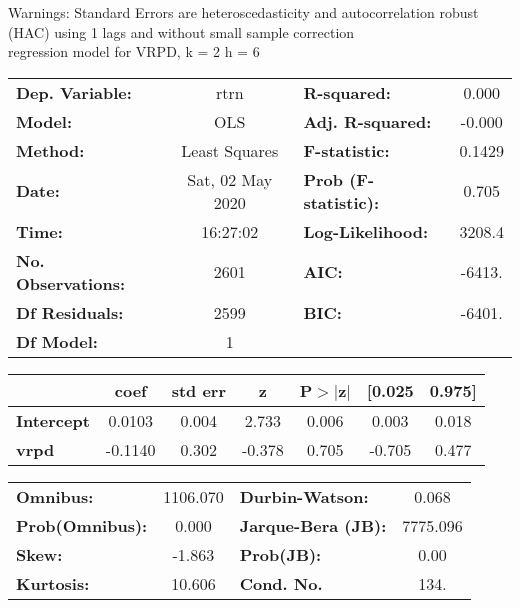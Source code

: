 Warnings: \newline
 [1] Standard Errors are heteroscedasticity and autocorrelation robust (HAC) using 1 lags and without small sample correction\\ 

regression model for VRPD, k = 2 h = 6\begin{center}
\begin{tabular}{lclc}
\toprule
\textbf{Dep. Variable:}    &       rtrn       & \textbf{  R-squared:         } &     0.000   \\
\textbf{Model:}            &       OLS        & \textbf{  Adj. R-squared:    } &    -0.000   \\
\textbf{Method:}           &  Least Squares   & \textbf{  F-statistic:       } &    0.1429   \\
\textbf{Date:}             & Sat, 02 May 2020 & \textbf{  Prob (F-statistic):} &    0.705    \\
\textbf{Time:}             &     16:27:02     & \textbf{  Log-Likelihood:    } &    3208.4   \\
\textbf{No. Observations:} &        2601      & \textbf{  AIC:               } &    -6413.   \\
\textbf{Df Residuals:}     &        2599      & \textbf{  BIC:               } &    -6401.   \\
\textbf{Df Model:}         &           1      & \textbf{                     } &             \\
\bottomrule
\end{tabular}
\begin{tabular}{lcccccc}
                   & \textbf{coef} & \textbf{std err} & \textbf{z} & \textbf{P$> |$z$|$} & \textbf{[0.025} & \textbf{0.975]}  \\
\midrule
\textbf{Intercept} &       0.0103  &        0.004     &     2.733  &         0.006        &        0.003    &        0.018     \\
\textbf{vrpd}      &      -0.1140  &        0.302     &    -0.378  &         0.705        &       -0.705    &        0.477     \\
\bottomrule
\end{tabular}
\begin{tabular}{lclc}
\textbf{Omnibus:}       & 1106.070 & \textbf{  Durbin-Watson:     } &    0.068  \\
\textbf{Prob(Omnibus):} &   0.000  & \textbf{  Jarque-Bera (JB):  } & 7775.096  \\
\textbf{Skew:}          &  -1.863  & \textbf{  Prob(JB):          } &     0.00  \\
\textbf{Kurtosis:}      &  10.606  & \textbf{  Cond. No.          } &     134.  \\
\bottomrule
\end{tabular}
\end{center}

